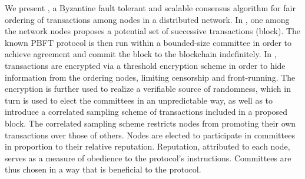 We present \emph{\nameNS}, a Byzantine fault tolerant and scalable consensus algorithm for fair ordering of transactions among nodes in a distributed network. In \nameNS, one among the network nodes proposes a potential set of successive transactions (block). The known PBFT protocol is then run within a bounded-size committee in order to achieve agreement and commit the block to the blockchain indefinitely. 
In \nameNS, transactions are encrypted via a threshold encryption scheme in order to hide information from the ordering nodes, limiting censorship and front-running. The encryption is further used to realize a verifiable source of randomness, which in turn is used to elect the committees in an unpredictable way, as well as to introduce a correlated sampling scheme of transactions included in a proposed block. The correlated sampling scheme restricts nodes from promoting their own transactions over those of others.
Nodes are elected to participate in committees in proportion to their relative reputation. Reputation, attributed to each node, serves as a measure of obedience to the protocol's instructions. Committees are thus chosen in a way that is beneficial to the protocol.